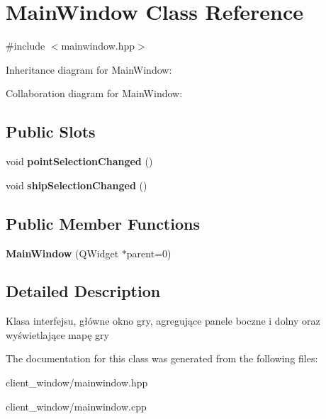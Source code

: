 \hypertarget{classMainWindow}{}\section{Main\+Window Class Reference}
\label{classMainWindow}


{\ttfamily \#include $<$mainwindow.\+hpp$>$}



Inheritance diagram for Main\+Window\+:


Collaboration diagram for Main\+Window\+:
\subsection*{Public Slots}
\begin{DoxyCompactItemize}
\item 
void {\bfseries point\+Selection\+Changed} ()\hypertarget{classMainWindow_a73fac02c2493063e8506d15efd884e3f}{}\label{classMainWindow_a73fac02c2493063e8506d15efd884e3f}

\item 
void {\bfseries ship\+Selection\+Changed} ()\hypertarget{classMainWindow_abbeb4fcfec5ba70d1ea02a25ad01cead}{}\label{classMainWindow_abbeb4fcfec5ba70d1ea02a25ad01cead}

\end{DoxyCompactItemize}
\subsection*{Public Member Functions}
\begin{DoxyCompactItemize}
\item 
{\bfseries Main\+Window} (Q\+Widget $\ast$parent=0)\hypertarget{classMainWindow_a8b244be8b7b7db1b08de2a2acb9409db}{}\label{classMainWindow_a8b244be8b7b7db1b08de2a2acb9409db}

\end{DoxyCompactItemize}


\subsection{Detailed Description}
Klasa interfejsu, główne okno gry, agregujące panele boczne i dolny oraz wyświetlające mapę gry 

The documentation for this class was generated from the following files\+:\begin{DoxyCompactItemize}
\item 
client\+\_\+window/mainwindow.\+hpp\item 
client\+\_\+window/mainwindow.\+cpp\end{DoxyCompactItemize}
